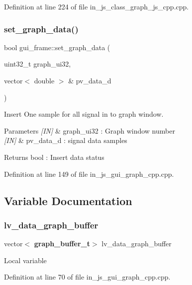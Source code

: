 Definition at line 224 of file in\+\_\+js\+\_\+class\+\_\+graph\+\_\+js\+\_\+cpp.\+cpp.

\mbox{\label{group___graph_ga99fe12a26fff4d837e4402cab9df19c6}} 
\subsubsection{set\_graph\_data()}
{\footnotesize\ttfamily bool gui\+\_\+frame\+::set\+\_\+graph\+\_\+data (\begin{DoxyParamCaption}\item[{uint32\+\_\+t}]{graph\+\_\+ui32,  }\item[{vector$<$ double $>$ \&}]{pv\+\_\+data\+\_\+d }\end{DoxyParamCaption})}



Insert One sample for all signal in to graph window. 


\begin{DoxyParams}{Parameters}
{\em \mbox{[}\+I\+N\mbox{]}} & graph\+\_\+ui32 \+: Graph window number \\
\hline
{\em \mbox{[}\+I\+N\mbox{]}} & pv\+\_\+data\+\_\+d \+: signal data samples \\
\hline
\end{DoxyParams}
\begin{DoxyReturn}{Returns}
bool \+: Insert data status 
\end{DoxyReturn}


Definition at line 149 of file in\+\_\+js\+\_\+gui\+\_\+graph\+\_\+cpp.\+cpp.



\subsection{Variable Documentation}
\mbox{\label{group___graph_ga70d4a6633d9b5972dcb026390127f139}} 
\subsubsection{lv\_data\_graph\_buffer}
{\footnotesize\ttfamily vector$<$\textbf{ graph\+\_\+buffer\+\_\+t}$>$ lv\+\_\+data\+\_\+graph\+\_\+buffer}

Local variable 

Definition at line 70 of file in\+\_\+js\+\_\+gui\+\_\+graph\+\_\+cpp.\+cpp.

